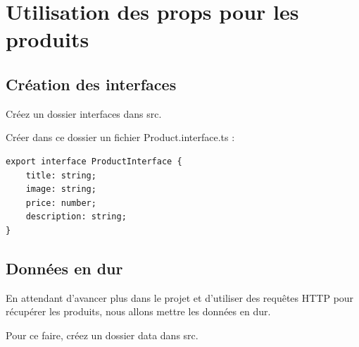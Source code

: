 \section{Utilisation des props pour les produits}
\subsection{Création des interfaces}
Créez un dossier interfaces dans src.

Créer dans ce dossier un fichier Product.interface.ts :
\begin{verbatim}
export interface ProductInterface {
    title: string;
    image: string;
    price: number;
    description: string;
}
\end{verbatim}
\subsection{Données en dur}
En attendant d'avancer plus dans le projet et d'utiliser des requêtes HTTP pour récupérer les produits, nous allons mettre les données en dur.

Pour ce faire, créez un dossier data dans src.

